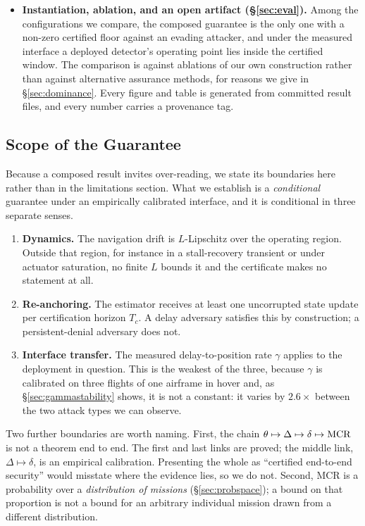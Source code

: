 \begin{itemize}
\item \textbf{Instantiation, ablation, and an open artifact
(\S\ref{sec:eval}).} Among the configurations we compare, the composed guarantee
is the only one with a non-zero certified floor against an evading attacker, and
under the measured interface a deployed detector's operating point lies inside
the certified window. The comparison is against ablations of our own
construction rather than against alternative assurance methods, for reasons we
give in \S\ref{sec:dominance}. Every figure and table is generated from
committed result files, and every number carries a provenance tag.
\end{itemize}

\subsection*{Scope of the Guarantee}
\label{sec:scope}
Because a composed result invites over-reading, we state its boundaries here
rather than in the limitations section. What we establish is a
\emph{conditional} guarantee under an empirically calibrated interface, and it
is conditional in three separate senses.

\begin{enumerate}[label=(C\arabic*),leftmargin=2.6em]
\item\label{c:lip} \textbf{Dynamics.} The navigation drift is $L$-Lipschitz over
the operating region. Outside that region, for instance in a stall-recovery
transient or under actuator saturation, no finite $L$ bounds it and the
certificate makes no statement at all.
\item\label{c:anchor} \textbf{Re-anchoring.} The estimator receives at least one
uncorrupted state update per certification horizon $T_c$. A delay adversary
satisfies this by construction; a persistent-denial adversary does not.
\item\label{c:interface} \textbf{Interface transfer.} The measured
delay-to-position rate $\gamma$ applies to the deployment in question. This is
the weakest of the three, because $\gamma$ is calibrated on three flights of one
airframe in hover and, as \S\ref{sec:gammastability} shows, it is not a
constant: it varies by $2.6\times$ between the two attack types we can observe.
\end{enumerate}

Two further boundaries are worth naming. First, the chain
$\theta\mapsto\Delta\mapsto\delta\mapsto\mathrm{MCR}$ is not a theorem end to end. The
first and last links are proved; the middle link, $\Delta\mapsto\delta$, is an
empirical calibration. Presenting the whole as ``certified end-to-end security''
would misstate where the evidence lies, so we do not. Second, MCR is a
probability over a \emph{distribution of missions}
(\S\ref{sec:probspace}); a bound on that proportion is not a bound for an
arbitrary individual mission drawn from a different distribution.

